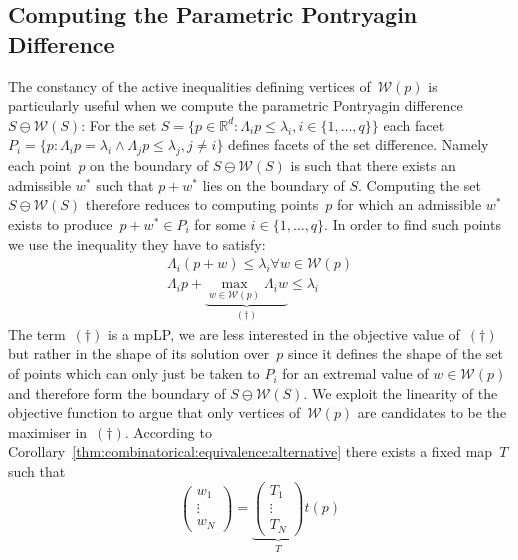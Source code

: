 \documentclass{elsarticle}
\theoremstyle{remark}
\theoremstyle{definition}
\begin{document}
\subsection{Computing the Parametric Pontryagin Difference}\label{ssec:computation:p:pontryagin:difference}
%
%
%
The constancy of the active inequalities defining vertices of~$\mathcal W(p)$ is particularly useful when we compute the parametric Pontryagin difference $S\ominus\mathcal W(S)$:
%
For the set $S=\{p\in\mathbb R^d:\Lambda_i p\leq\lambda_i,i\in\{1,\dots,q\}\}$ each facet $P_i=\{p:\Lambda_i p=\lambda_i\wedge\Lambda_j p\leq\lambda_j,j\neq i\}$ defines facets of the set difference.
%
Namely each point~$p$ on the boundary of $S\ominus\mathcal W(S)$ is such that there exists an admissible $w^\ast$ such that $p+w^\ast$ lies on the boundary of $S$.
%
Computing the set $S\ominus\mathcal W(S)$ therefore reduces to computing points~$p$ for which an admissible $w^\ast$ exists to produce~$p+w^\ast\in P_i$ for some $i\in\{1,\dots,q\}$.
%
In order to find such points we use the inequality they have to satisfy:
%
\begin{equation}\begin{split}
  \Lambda_i(p+w)\leq\lambda_i\forall w\in\mathcal W(p)\\
  \Lambda_i p+\underbrace{\max_{w\in\mathcal W(p)}\Lambda_i w}_{(\dagger)}\leq\lambda_i
\end{split}\end{equation}
%
The term~$(\dagger)$ is a mpLP, we are less interested in the objective value of~$(\dagger)$ but rather in the shape of its solution over~$p$ since it defines the shape of the set of points 
which can only just be taken to $P_i$ for an extremal value of $w\in\mathcal W(p)$ and therefore form the boundary of $S\ominus \mathcal W(S)$.
%
We exploit the linearity of the objective function to argue that only vertices of~$\mathcal W(p)$ are candidates to be the maximiser in~$(\dagger)$.
%
According to Corollary~\ref{thm:combinatorical:equivalence:alternative} there exists a fixed map~$T$ such that 
%
\begin{equation}
  \begin{pmatrix}w_1\\ \vdots\\ w_N\end{pmatrix} = \underbrace{\begin{pmatrix}T_1\\ \vdots\\ T_N\end{pmatrix}}_T t(p)
\end{equation}
\end{document}
